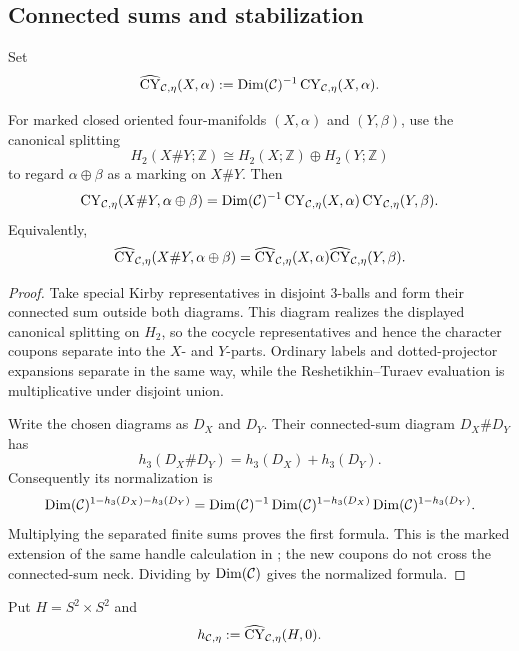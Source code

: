\subsection{Connected sums and stabilization}
\label{subsec:connected-sums}

\begin{definition}
\label{def:normalized-invariant}
Set
\[
  \widehat{\operatorname{CY}}_{\mathcal{C},\eta}(X,\alpha)
  :=\operatorname{Dim}(\mathcal{C})^{-1}
    \operatorname{CY}_{\mathcal{C},\eta}(X,\alpha).
\]
\end{definition}

\begin{proposition}
\label{prop:connected-sum-formula}
For marked closed oriented four-manifolds $(X,\alpha)$ and $(Y,\beta)$,
use the canonical splitting
\[
  H_2(X\#Y;\mathbb Z)
  \cong H_2(X;\mathbb Z)\oplus H_2(Y;\mathbb Z)
\]
to regard $\alpha\oplus\beta$ as a marking on $X\#Y$.  Then
\[
  \operatorname{CY}_{\mathcal{C},\eta}(X\#Y,\alpha\oplus\beta)
  =\operatorname{Dim}(\mathcal{C})^{-1}
   \operatorname{CY}_{\mathcal{C},\eta}(X,\alpha)
   \operatorname{CY}_{\mathcal{C},\eta}(Y,\beta).
\]
Equivalently,
\[
  \widehat{\operatorname{CY}}_{\mathcal{C},\eta}(X\#Y,\alpha\oplus\beta)
  =\widehat{\operatorname{CY}}_{\mathcal{C},\eta}(X,\alpha)
   \widehat{\operatorname{CY}}_{\mathcal{C},\eta}(Y,\beta).
\]
\end{proposition}

\begin{proof}
Take special Kirby representatives in disjoint $3$-balls and form their
connected sum outside both diagrams.  This diagram realizes the displayed
canonical splitting on $H_2$, so the cocycle representatives and hence the
character coupons separate into the $X$- and $Y$-parts.  Ordinary labels
and dotted-projector expansions separate in the same way, while the
Reshetikhin--Turaev evaluation is multiplicative under disjoint union.

Write the chosen diagrams as $D_X$ and $D_Y$.  Their connected-sum diagram
$D_X\#D_Y$ has
\[
  h_3(D_X\#D_Y)=h_3(D_X)+h_3(D_Y).
\]
Consequently its normalization is
\[
  \operatorname{Dim}(\mathcal{C})^{1-h_3(D_X)-h_3(D_Y)}
  =\operatorname{Dim}(\mathcal{C})^{-1}
   \operatorname{Dim}(\mathcal{C})^{1-h_3(D_X)}
   \operatorname{Dim}(\mathcal{C})^{1-h_3(D_Y)}.
\]
Multiplying the separated finite sums proves the first formula.  This is
the marked extension of the same handle calculation in
\cite[Proposition~5.14]{Tham2021}; the new coupons do not cross the
connected-sum neck.  Dividing by $\operatorname{Dim}(\mathcal{C})$ gives the
normalized formula.
\end{proof}

Put $H=S^2\times S^2$ and
\[
  h_{\mathcal{C},\eta}:=
    \widehat{\operatorname{CY}}_{\mathcal{C},\eta}(H,0).
\]

